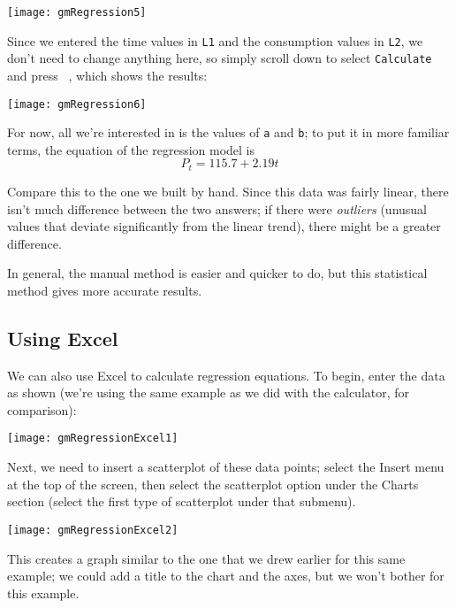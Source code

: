 \begin{center}
\texttt{[image: gmRegression5]}
\end{center}

Since we entered the time values in \texttt{L1} and the consumption values in \texttt{L2}, we don't need to change anything here, so simply scroll down to select \texttt{Calculate} and press \ , which shows the results:

\begin{center}
\texttt{[image: gmRegression6]}
\end{center}

For now, all we're interested in is the values of \texttt{a} and \texttt{b}; to put it in more familiar terms, the equation of the regression model is
\[P_t = 115.7 + 2.19t\]

Compare this to the one we built by hand.  Since this data was fairly linear, there isn't much difference between the two answers; if there were \emph{outliers} (unusual values that deviate significantly from the linear trend), there might be a greater difference.

In general, the manual method is easier and quicker to do, but this statistical method gives more accurate results.
\pagebreak

\subsection{Using Excel}
We can also use Excel to calculate regression equations.  To begin, enter the data as shown (we're using the same example as we did with the calculator, for comparison):

\begin{center}
\texttt{[image: gmRegressionExcel1]}
\end{center}

Next, we need to insert a scatterplot of these data points; select the Insert menu at the top of the screen, then select the scatterplot option under the Charts section (select the first type of scatterplot under that submenu).

\begin{center}
\texttt{[image: gmRegressionExcel2]}
\end{center}

This creates a graph similar to the one that we drew earlier for this same example; we could add a title to the chart and the axes, but we won't bother for this example.

